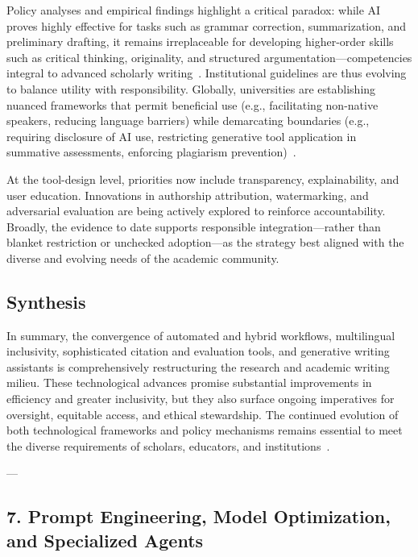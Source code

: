 \documentclass[11pt]{article}
\begin{document}
Policy analyses and empirical findings highlight a critical paradox: while AI proves highly effective for tasks such as grammar correction, summarization, and preliminary drafting, it remains irreplaceable for developing higher-order skills such as critical thinking, originality, and structured argumentation—competencies integral to advanced scholarly writing~\cite{104,109,110}. Institutional guidelines are thus evolving to balance utility with responsibility. Globally, universities are establishing nuanced frameworks that permit beneficial use (e.g., facilitating non-native speakers, reducing language barriers) while demarcating boundaries (e.g., requiring disclosure of AI use, restricting generative tool application in summative assessments, enforcing plagiarism prevention)~\cite{104,110}.

At the tool-design level, priorities now include transparency, explainability, and user education. Innovations in authorship attribution, watermarking, and adversarial evaluation are being actively explored to reinforce accountability. Broadly, the evidence to date supports responsible integration—rather than blanket restriction or unchecked adoption—as the strategy best aligned with the diverse and evolving needs of the academic community.

\subsection{Synthesis}

In summary, the convergence of automated and hybrid workflows, multilingual inclusivity, sophisticated citation and evaluation tools, and generative writing assistants is comprehensively restructuring the research and academic writing milieu. These technological advances promise substantial improvements in efficiency and greater inclusivity, but they also surface ongoing imperatives for oversight, equitable access, and ethical stewardship. The continued evolution of both technological frameworks and policy mechanisms remains essential to meet the diverse requirements of scholars, educators, and institutions~\cite{10,11,12,28,29,30,31,35,36,37,38,39,46,47,49,51,62,76,80,86,88,89,90,91,92,93,94,96,97,98,100,102,104,105,107,108,109,110}.

---

\subsection{7. Prompt Engineering, Model Optimization, and Specialized Agents}
\end{document}

